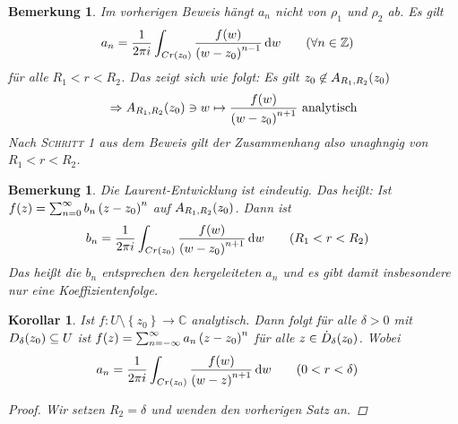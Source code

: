 \documentclass[11pt, a4paper]{article}
\theoremstyle{plain}
\newtheorem{bemerkung}[blockelement]{Bemerkung}
\newtheorem{korollar}[blockelement]{Korollar}
\numberwithin{equation}{subsection}
\newcommand{\set}[1]{\left\{#1\right\}}
\newcommand{\pair}[1]{\left(#1\right)}
\newcommand{\of}[1]{\mathopen{}\mathclose{}\bgroup\left(#1\aftergroup\egroup\right)}
\newcommand{\impl}[0]{\Rightarrow{}}
\newcommand{\dif}{\mathop{}\!\mathrm{d}}
\newcommand{\C}{\mathbb{C}}
\newcommand{\Z}{\mathbb{Z}}
\begin{document}
    \begin{bemerkung}
        Im vorherigen Beweis hängt $a_n$ nicht von $\rho_1$ und $\rho_2$ ab. Es gilt
        \begin{align*}
            a_n &= \frac{1}{2\pi i} \int_{C r\of{z_0}}^{} \frac{f\of{w}}{\pair{w-z_0}^{n-1}} \dif w\tag{$\forall n\in\Z$}
        \end{align*}
        für alle $R_1 < r < R_2$. Das zeigt sich wie folgt: Es gilt $z_0 \not\in A_{R_1, R_2}\of{z_0}$
        \begin{align*}
            \impl A_{R_1, R_2}\of{z_0} \ni w \mapsto \frac{f\of{w}}{\pair{w-z_0}^{n+1}}\text{ analytisch}
        \end{align*}
        Nach \textsc{Schritt 1} aus dem Beweis gilt der Zusammenhang also unaghngig von $R_1 < r < R_2$.
    \end{bemerkung}

    \begin{bemerkung}
        Die Laurent-Entwicklung ist eindeutig. Das heißt: Ist $f\of{z} = \sum_{n=0}^{\infty} b_n\pair{z-z_0}^n$ auf $A_{R_1, R_2}\of{z_0}$. Dann ist
        \begin{align*}
            b_n &= \frac{1}{2\pi i} \int_{C r\of{z_0}}^{} \frac{f\of{w}}{\pair{w-z_0}^{n+1}} \dif w\tag{$R_1 < r < R_2$}
        \end{align*}
        Das heißt die $b_n$ entsprechen den hergeleiteten $a_n$ und es gibt damit insbesondere nur eine Koeffizientenfolge.
    \end{bemerkung}

    \begin{korollar}
        Ist $f: U\setminus\set{z_0} \to \C$ analytisch. Dann folgt für alle $\delta > 0$ mit $D_{\delta}\of{z_0}\subseteq U$ ist $f\of{z} = \sum_{n=-\infty}^{\infty} a_n\pair{z-z_0}^n$ für alle $z\in \dot D_{\delta}\of{z_0}$. Wobei
        \begin{align*}
            a_n &= \frac{1}{2\pi i}\int_{C r\of{z_0}}^{} \frac{f\of{w}}{\pair{w-z}^{n+1}} \dif w\tag{$0 < r < \delta$}
        \end{align*}
        \begin{proof}
            Wir setzen $R_2 = \delta$ und wenden den vorherigen Satz an.
        \end{proof}
    \end{korollar}
\end{document}

